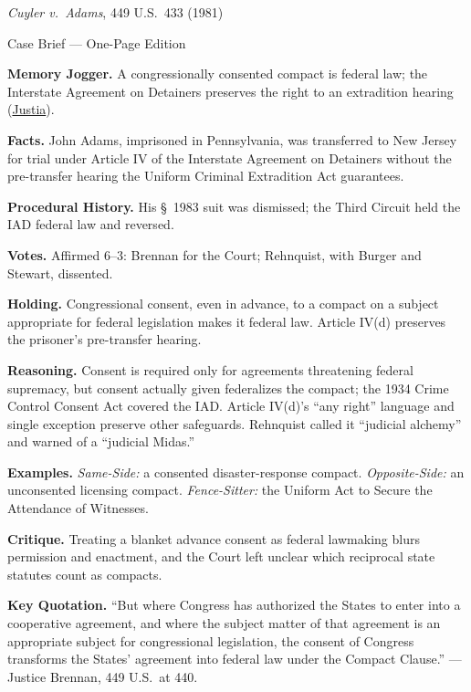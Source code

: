 \documentclass[12pt]{article}
\begin{document}
\begin{center}
{\Large \textit{Cuyler v.\ Adams}, 449 U.S.\ 433 (1981)\par}
\vspace{0.3em}
{\normalsize Case Brief --- One-Page Edition\par}
\end{center}

\textbf{Memory Jogger.} A congressionally consented compact is federal law; the Interstate Agreement on Detainers preserves the right to an extradition hearing (\href{https://supreme.justia.com/cases/federal/us/449/433/}{Justia}).

\textbf{Facts.} John Adams, imprisoned in Pennsylvania, was transferred to New Jersey for trial under Article IV of the Interstate Agreement on Detainers without the pre-transfer hearing the Uniform Criminal Extradition Act guarantees.

\textbf{Procedural History.} His \S~1983 suit was dismissed; the Third Circuit held the IAD federal law and reversed.

\textbf{Votes.} Affirmed 6--3: Brennan for the Court; Rehnquist, with Burger and Stewart, dissented.

\textbf{Holding.} Congressional consent, even in advance, to a compact on a subject appropriate for federal legislation makes it federal law. Article IV(d) preserves the prisoner's pre-transfer hearing.

\textbf{Reasoning.} Consent is required only for agreements threatening federal supremacy, but consent actually given federalizes the compact; the 1934 Crime Control Consent Act covered the IAD. Article IV(d)'s ``any right'' language and single exception preserve other safeguards. Rehnquist called it ``judicial alchemy'' and warned of a ``judicial Midas.''

\textbf{Examples.} \emph{Same-Side:} a consented disaster-response compact. \emph{Opposite-Side:} an unconsented licensing compact. \emph{Fence-Sitter:} the Uniform Act to Secure the Attendance of Witnesses.

\textbf{Critique.} Treating a blanket advance consent as federal lawmaking blurs permission and enactment, and the Court left unclear which reciprocal state statutes count as compacts.

\textbf{Key Quotation.} ``But where Congress has authorized the States to enter into a cooperative agreement, and where the subject matter of that agreement is an appropriate subject for congressional legislation, the consent of Congress transforms the States' agreement into federal law under the Compact Clause.'' --- Justice Brennan, 449 U.S.\ at 440.
\end{document}
